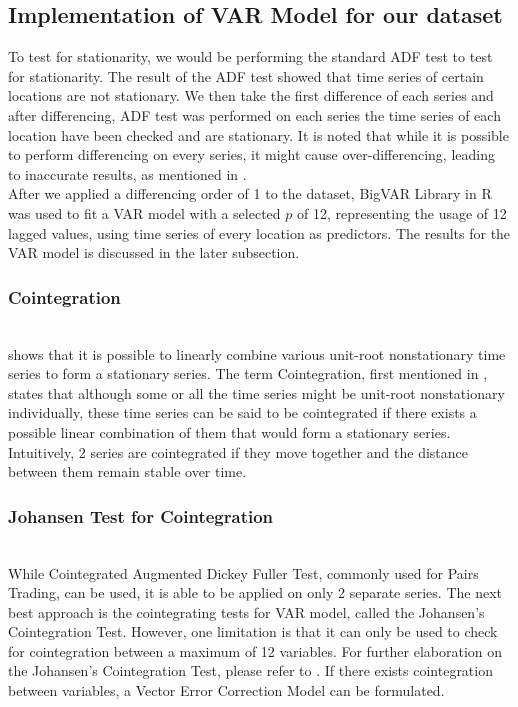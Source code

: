 \documentclass[nonblindrev,msom]{informs3} %
\begin{document}
\subsection{Implementation of VAR Model for our dataset}

To test for stationarity, we would be performing the standard ADF test to test for stationarity. The result of the ADF test showed that time series of certain locations are not stationary. We then take the first difference of each series and after differencing, ADF test was performed on each series the time series of each location have been checked and are stationary. It is noted that while it is possible to perform differencing on every series, it might cause over-differencing, leading to inaccurate results, as mentioned in \cite{Ruey2014}. \\

\noindent After we applied a differencing order of 1 to the dataset, BigVAR Library in R was used to fit a VAR model with a selected $p$ of 12, representing the usage of 12 lagged values, using time series of every location as predictors. The results for the VAR model is discussed in the later subsection. 


\subsubsection{Cointegration}
\hfill\\
\cite{Box1977} shows that it is possible to linearly combine various unit-root nonstationary time series to form a stationary series. The term Cointegration, first mentioned in \cite{Granger1983}, states that although some or all the time series might be unit-root nonstationary individually, these time series can be said to be cointegrated if there exists a possible linear combination of them that would form a stationary series. Intuitively, 2 series are cointegrated if they move together and the distance between them remain stable over time. 

\subsubsection{Johansen Test for Cointegration}
\hfill\\
While Cointegrated Augmented Dickey Fuller Test, commonly used for Pairs Trading, can be used, it is able to be applied on only 2 separate series. The next best approach is the cointegrating tests for VAR model, called the Johansen's Cointegration Test. However, one limitation is that it can only be used to check for cointegration between a maximum of 12 variables. For further elaboration on the Johansen's Cointegration Test, please refer to \cite{Johansen1991}. If there exists cointegration between variables, a Vector Error Correction Model can be formulated. \\
\end{document}
